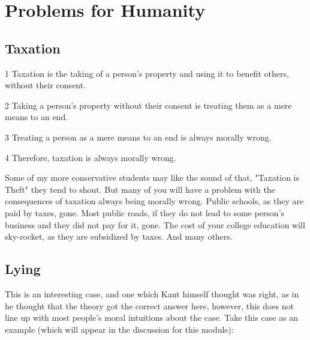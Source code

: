 \section{Problems for Humanity}

\subsection{Taxation}
\begin{earg}
    \item[1] Taxation is the taking of a person’s property and using it to benefit others, without their consent.
    \item[2] Taking a person’s property without their consent is treating them as a mere means to an end.
    \item[3] Treating a person as a mere means to an end is always morally wrong.
    \item[4] Therefore, taxation is always morally wrong.
\end{earg}
Some of my more conservative students may like the sound of that, "Taxation is Theft" they tend to shout. But many of you will have a problem with the consequences of taxation always being morally wrong. Public schools, as they are paid by taxes, gone. Most public roads, if they do not lead to some person's business and they did not pay for it, gone. The cost of your college education will sky-rocket, as they are subsidized by taxes. And many others.

\subsection{Lying}

This is an interesting case, and one which Kant himself thought was right, as in he thought that the theory got the correct answer here, however, this does not line up with most people's moral intuitions about the case. Take this case as an example (which will appear in the discussion for this module):


